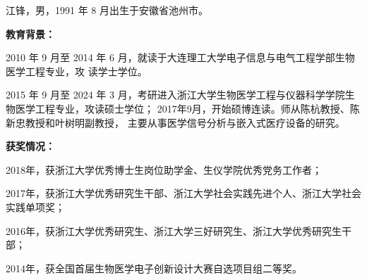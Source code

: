 \cleardoublepage
{}
江锋，男，1991 年 8 月出生于安徽省池州市。

\bigskip
\noindent\textbf{教育背景：}

2010 年 9 月至 2014 年 6 月，就读于大连理工大学电子信息与电气工程学部生物医学工程专业，攻
读学士学位。

2015 年 9 月至 2024 年 3 月，考研进入浙江大学生物医学工程与仪器科学学院生物医学工程专业，攻读硕士学位；
2017年9月，开始硕博连读。师从陈杭教授、陈新忠教授和叶树明副教授，
主要从事医学信号分析与嵌入式医疗设备的研究。

\bigskip
\noindent\textbf{获奖情况：}

2018年，获浙江大学优秀博士生岗位助学金、生仪学院优秀党务工作者；

2017年，获浙江大学优秀研究生干部、浙江大学社会实践先进个人、浙江大学社会实践单项奖；

2016年，获浙江大学优秀研究生、浙江大学三好研究生、浙江大学优秀研究生干部；

2014年，获全国首届生物医学电子创新设计大赛自选项目组二等奖。